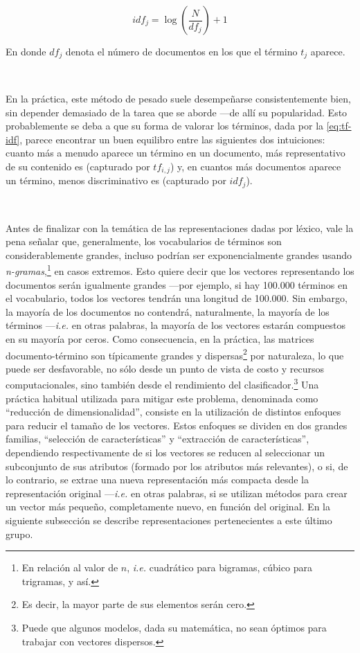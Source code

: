 $$idf_{j}=\log\left(\frac{N}{df_j}\right)+1$$

En donde $df_j$ denota el número de documentos en los que el término $t_j$ aparece.

\

En la práctica, este método de pesado suele desempeñarse consistentemente bien, sin depender demasiado de la tarea que se aborde ---de allí su popularidad. Esto probablemente se deba a que su forma de valorar los términos, dada por la \autoref{eq:tf-idf}, parece encontrar un buen equilibro entre las siguientes dos intuiciones: cuanto más a menudo aparece un término en un documento, más representativo de su contenido es (capturado por $tf_{i,j}$) y, en cuantos más documentos aparece un término, menos discriminativo es (capturado por $idf_{j}$).

\


Antes de finalizar con la temática de las representaciones dadas por léxico, vale la pena señalar que, generalmente, los vocabularios de términos son considerablemente grandes, incluso podrían ser exponencialmente grandes usando \emph{n-gramas},\footnote{En relación al valor de $n$, \emph{i.e.} cuadrático para bigramas, cúbico para trigramas, y así.} en casos extremos.
Esto quiere decir que los vectores representando los documentos serán igualmente grandes ---por ejemplo, si hay 100.000 términos en el vocabulario, todos los vectores tendrán una longitud de 100.000.
Sin embargo, la mayoría de los documentos no contendrá, naturalmente, la mayoría de los términos ---\emph{i.e.} en otras palabras, la mayoría de los vectores estarán compuestos en su mayoría por ceros. 
Como consecuencia, en la práctica, las matrices documento-término son típicamente grandes y dispersas\footnote{Es decir, la mayor parte de sus elementos serán cero.} por naturaleza, lo que puede ser desfavorable, no sólo desde un punto de vista de costo y recursos computacionales, sino también desde el rendimiento del clasificador.\footnote{Puede que algunos modelos, dada su matemática, no sean óptimos para trabajar con vectores dispersos.}
Una práctica habitual utilizada para mitigar este problema, denominada como ``reducción de dimensionalidad'', consiste en la utilización de distintos enfoques para reducir el tamaño de los vectores.
Estos enfoques se dividen en dos grandes familias, ``selección de características'' y ``extracción de características'', dependiendo respectivamente de si los vectores se reducen al seleccionar un subconjunto de sus atributos (formado por los atributos más relevantes), o si, de lo contrario, se extrae una nueva representación más compacta desde la representación original ---\emph{i.e.} en otras palabras, si se utilizan métodos para crear un vector más pequeño, completamente nuevo, en función del original.
En la siguiente subsección se describe representaciones pertenecientes a este último grupo.


